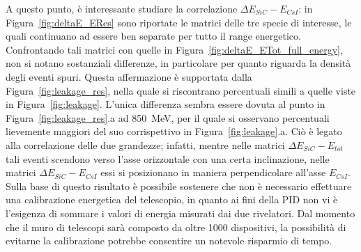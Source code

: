 A questo punto, è interessante studiare la correlazione $\Delta E_{SiC} - E_{CsI}$: in Figura~\ref{fig:deltaE_ERes} sono riportate le matrici delle tre specie di interesse, le quali continuano ad essere ben separate per tutto il range energetico. 
Confrontando tali matrici con quelle in Figura~\ref{fig:deltaE_ETot_full_energy}, non si notano sostanziali differenze, in particolare per quanto riguarda la densità degli eventi spuri.
Questa affermazione è supportata dalla Figura~\ref{fig:leakage_res}, nella quale si riscontrano percentuali simili a quelle viste in Figura~\ref{fig:leakage}.
L'unica differenza sembra essere dovuta al punto in Figura~\ref{fig:leakage_res}.a ad 850~MeV, per il quale si osservano percentuali lievemente maggiori del suo corrispettivo in Figura~\ref{fig:leakage}.a. 
Ciò è legato alla correlazione delle due grandezze;
infatti, mentre nelle matrici $\Delta E_{SiC} - E_{tot}$ tali eventi scendono verso l'asse orizzontale con una certa inclinazione, nelle matrici $\Delta E_{SiC} - E_{CsI}$ essi si posizionano in maniera perpendicolare all'asse $E_{CsI}$. 
Sulla base di questo risultato è possibile sostenere che non è necessario effettuare una calibrazione energetica del telescopio, in quanto ai fini della PID non vi è l'esigenza di sommare i valori di energia misurati dai due rivelatori.
Dal momento che il muro di telescopi sarà composto da oltre 1000 dispositivi, la possibilità di evitarne la calibrazione potrebbe consentire un notevole risparmio di tempo.


